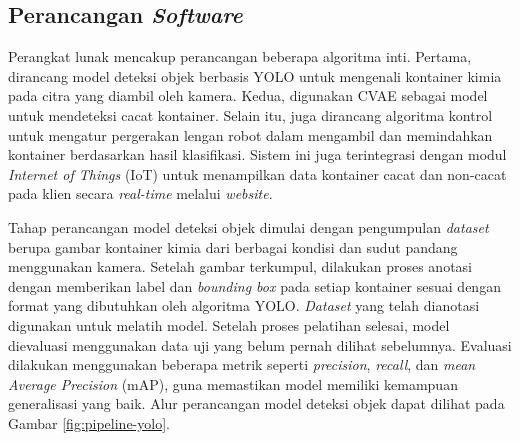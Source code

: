 \vspace{1em}

\subsection{Perancangan \textit{Software}}
Perangkat lunak mencakup perancangan beberapa
algoritma inti. Pertama, dirancang model deteksi objek berbasis YOLO
untuk mengenali kontainer kimia pada citra yang diambil oleh kamera.
Kedua, digunakan CVAE sebagai model untuk
mendeteksi cacat kontainer. Selain itu,
juga dirancang algoritma kontrol untuk mengatur pergerakan lengan
robot dalam mengambil dan memindahkan kontainer berdasarkan hasil
klasifikasi. Sistem ini juga terintegrasi dengan modul
\textit{Internet of Things} (IoT) untuk menampilkan data kontainer
cacat dan non-cacat
pada klien secara \textit{real-time} melalui \textit{website}. \par

Tahap perancangan model deteksi objek dimulai dengan pengumpulan
\textit{dataset} berupa gambar kontainer kimia dari berbagai kondisi
dan sudut pandang menggunakan kamera. Setelah gambar terkumpul, dilakukan
proses anotasi dengan memberikan label dan \textit{bounding box} pada
setiap kontainer sesuai dengan format yang dibutuhkan oleh algoritma
YOLO. \textit{Dataset} yang telah dianotasi digunakan untuk
melatih model. Setelah proses pelatihan selesai, model dievaluasi
menggunakan data uji yang belum pernah dilihat sebelumnya. Evaluasi
dilakukan menggunakan beberapa metrik seperti \textit{precision},
\textit{recall}, dan \textit{mean Average Precision} (mAP), guna
memastikan model memiliki kemampuan generalisasi yang baik.
Alur perancangan model deteksi objek dapat dilihat pada
Gambar \ref{fig:pipeline-yolo}.


